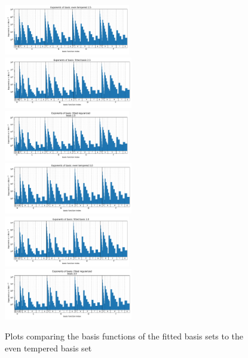 \begin{figure}
    \centering
    \includegraphics[width=0.49\textwidth]{chapters/results/results_images/basis_functions_even_tempered_2.5}
    \includegraphics[width=0.5\textwidth]{chapters/results/results_images/basis_functions_fitted_basis_2.5}
    \includegraphics[width=0.49\textwidth]{chapters/results/results_images/basis_functions_fitted_regularized_basis_2.5}
    \includegraphics[width=0.5\textwidth]{chapters/results/results_images/basis_functions_even_tempered_3.0}
    \includegraphics[width=0.49\textwidth]{chapters/results/results_images/basis_functions_fitted_basis_3.0}
    \includegraphics[width=0.5\textwidth]{chapters/results/results_images/basis_functions_fitted_regularized_basis_3.0}
    \caption{Plots comparing the basis functions of the fitted basis sets to the even tempered basis set}
\end{figure}

